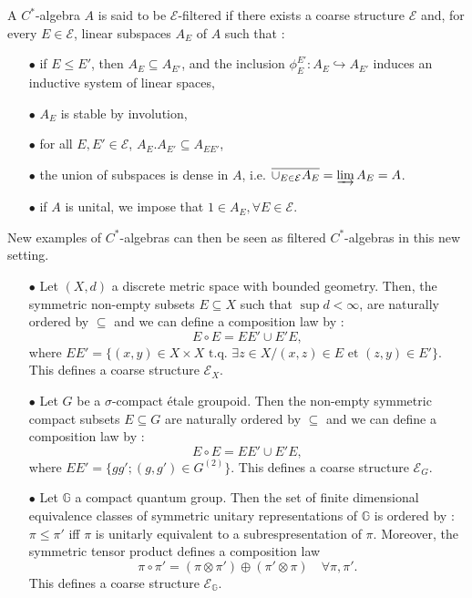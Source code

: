 \begin{definition}
A $C^*$-algebra $A$ is said to be $\mathcal E$-filtered if there exists a coarse structure $\mathcal E$ and, for every $E\in \mathcal E$, linear subspaces $A_E$ of $A$ such that :\\
\begin{itemize}
\item[$\bullet$] if $E \leq E'$, then $A_E\subseteq A_{E'}$, and the inclusion $\phi_E^{E'}: A_E\hookrightarrow A_{E'}$ induces an inductive system of linear spaces,
\item[$\bullet$] $A_E$ is stable by involution,
\item[$\bullet$] for all $E,E'\in\mathcal E$, $A_E.A_{E'}\subseteq A_{EE'}$,
\item[$\bullet$] the union of subspaces is dense in $A$, i.e. $\overline{\cup_{E\in\mathcal E}A_E} = \varinjlim A_E = A$.
\item[$\bullet$] if $A$ is unital, we impose that $1\in A_E,\forall E\in\mathcal E$.
\end{itemize}
\end{definition} 

New examples of $C^*$-algebras can then be seen as filtered $C^*$-algebras in this new setting. \\

\begin{itemize} 
\item[$\bullet$] Let $(X,d)$ a discrete metric space with bounded geometry. Then, the symmetric non-empty subsets $E\subseteq X$ such that $\sup d<\infty$, are naturally ordered by $\subseteq$ and we can define a composition law by :
\[E\circ E = EE'\cup E'E,\]
where $EE' = \{(x,y)\in X\times X \text{ t.q. }\exists z\in X / (x,z)\in E \text{ et }(z,y)\in E'\}$. This defines a coarse structure $\mathcal E_X$.
\item[$\bullet$] Let $G$ be a $\sigma$-compact étale groupoid. Then the non-empty symmetric compact subsets $E\subseteq G$ are naturally ordered by $\subseteq$ and we can define a composition law by :
\[E\circ E = EE'\cup E'E,\]
where $EE' = \{gg' ; (g,g')\in G^{(2)}\}$. This defines a coarse structure $\mathcal E_G$.
\item[$\bullet$] Let $\mathbb G$ a compact quantum group. Then the set of finite dimensional equivalence classes of symmetric unitary representations of $\mathbb G$ is ordered by : $\pi\leq \pi'$ iff $\pi$ is unitarly equivalent to a subrespresentation of $\pi$. Moreover, the symmetric tensor product defines a composition law
\[\pi\circ \pi' = (\pi\otimes\pi' )\oplus (\pi'\otimes \pi) \quad \forall \pi,\pi'.\] This defines a coarse structure $\mathcal E_{\mathbb G}$.\\
\end{itemize} 

